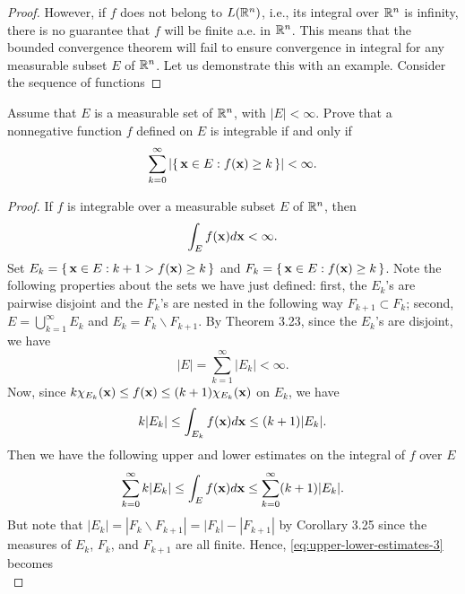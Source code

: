 \begin{proof}
However, if $f$ does not belong to $L(\mathbb{R}^n)$, i.e., its integral over
$\mathbb{R}^n$ is infinity, there is no guarantee that $f$ will be finite a.e.\@
in $\mathbb{R}^n$. This means that the bounded convergence theorem will fail to
ensure convergence in integral for any measurable subset $E$ of
$\mathbb{R}^n$. Let us demonstrate this with an example. Consider the sequence of
functions
\end{proof}

\begin{problem}
Assume that $E$ is a measurable set of $\mathbb{R}^n$, with
$|E|<\infty$. Prove that a nonnegative function $f$ defined
on $E$ is integrable if and only if
\[
\sum_{k=0}^\infty\left|\left\{\,\mathbf{x}\in E:f(\mathbf{x})\geq
    k\,\right\}\right|<\infty.
\]
\end{problem}
\begin{proof}
If $f$ is integrable over a measurable subset $E$ of $\mathbb{R}^n$, then
\begin{equation}
\label{eq:integrability-3}
\int_E f(\mathbf{x}) d \mathbf{x}<\infty.
\end{equation}
Set $E_k=\left\{\,\mathbf{x}\in E:k+1>f(\mathbf{x})\geq k\,\right\}$ and
$F_k=\left\{\,\mathbf{x}\in E:f(\mathbf{x})\geq k\,\right\}$. Note the
following properties about the sets we have just defined: first, the
$E_k$'s are pairwise disjoint and the $F_k$'s are nested in the following
way $F_{k+1}\subset F_k$; second, $E=\bigcup_{k=1}^\infty E_k$ and
$E_k=F_k\smallsetminus F_{k+1}$. By Theorem 3.23, since the $E_k$'s are disjoint,
we have
\begin{equation}
  \label{eq:disjoint-measurable-sets-3}
|E|=\sum_{k=1}^\infty|E_k|<\infty.
\end{equation}
Now, since $k\chi_{E_k}(\mathbf{x})\leq f(\mathbf{x})\leq (k+1)\chi_{E_k}(\mathbf{x})$ on
$E_k$, we have
\begin{equation}
\label{eq:estimates-E-k-3}
k|E_k|\leq\int_{E_k}f(\mathbf{x}) d \mathbf{x}\leq (k+1)|E_k|.
\end{equation}
Then we have the following upper and lower estimates on the integral of $f$
over $E$
\begin{equation}
\label{eq:upper-lower-estimates-3}
\sum_{k=0}^\infty k|E_k|\leq\int_E f(\mathbf{x}) d \mathbf{x}\leq\sum_{k=0}^\infty(k+1)|E_k|.
\end{equation}
But note that $|E_k|=|F_k\smallsetminus F_{k+1}|=|F_k|-|F_{k+1}|$ by Corollary 3.25
since the measures of $E_k$, $F_k$, and $F_{k+1}$ are all finite. Hence,
\eqref{eq:upper-lower-estimates-3} becomes
\begin{equation}
\label{eq:new-upper-lower-estimates-3}

\end{equation}
\end{proof}
